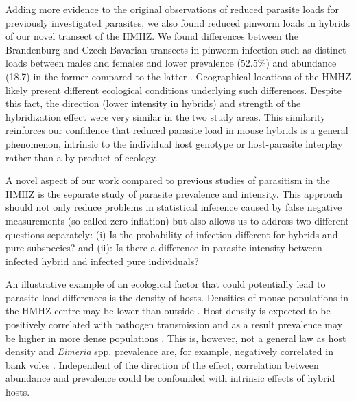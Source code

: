 \par Adding more evidence to the original observations of reduced parasite loads for previously investigated parasites, we also found reduced pinworm loads in hybrids of our novel transect of the HMHZ. We found differences between the Brandenburg and Czech-Bavarian transects in pinworm infection such as distinct loads between males and females and lower prevalence (52.5\%) and abundance (18.7) in the former compared to the latter \parencite[no significant difference between sexes; prevalence 70.9\%, abundance 39.18;][]{baird_where_2012}. Geographical locations of the HMHZ likely present different ecological conditions underlying such differences. Despite this fact, the direction (lower intensity in hybrids) and strength of the hybridization effect were very similar in the two study areas. This similarity reinforces our confidence that reduced parasite load in mouse hybrids is a general phenomenon, intrinsic to the individual host genotype or host-parasite interplay rather than a by-product of ecology.
\par A novel aspect of our work compared to previous studies of parasitism in the HMHZ is the separate study of parasite prevalence and intensity. This approach should not only reduce problems in statistical inference caused by false negative measurements (so called zero-inflation) but also allows us to address two different questions separately: (i) Is the probability of infection different for hybrids and pure subspecies? and (ii): Is there a difference in parasite intensity between infected hybrid and infected pure individuals? 
\par An illustrative example of an ecological factor that could potentially lead to parasite load differences is the density of hosts. Densities of mouse populations in the HMHZ centre may be lower than outside \parencite[either due to selection against hybrids or because the HMHZ as a tension zone tends to be trapped in “density troughs” sensu][]{hewitt_sex-chromosome_1975}. Host density is expected to be positively correlated with pathogen transmission \citep{anderson_population_1979} and as a result prevalence may be higher in more dense populations \citep{morand_distribution_2000, hakkarainen_eimeria-parasites_2007}. This is, however, not a general law as host density and \textit{Eimeria} spp. prevalence are, for example, negatively correlated in bank voles \citep{winternitz_parasite_2012}. Independent of the direction of the effect, correlation between abundance and prevalence could be confounded with intrinsic effects of hybrid hosts.

